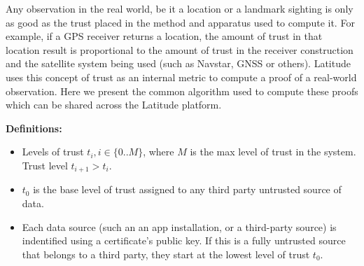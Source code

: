 Any observation in the real world, be it a location or a landmark sighting is only as good as the trust placed in the
method and apparatus used to compute it. For example, if a GPS receiver returns a location, the amount of trust in that
location result is proportional to the amount of trust in the receiver construction and the satellite system being used
(such as Navstar, GNSS or others). Latitude uses this concept of trust as an internal metric to compute a proof of a
real-world observation.  Here we present the common algorithm used to compute these proofs which can be shared across
the Latitude platform.

\newcommand\NF{\mathit{Nf}}
\newcommand\TM{\mathit{Tm}}
\noindent
{\bf Definitions:}
\begin{itemize}
    \item Levels of trust $t_i, i \in \{0..M\}$, where $M$ is the max level of trust in the system. Trust level $t_{i+1} >
        t_i$.
    \item $t_0$ is the base level of trust assigned to any third party untrusted source of data.

    \item Each data source (such an an app installation, or a third-party source) is indentified using a certificate's
        public key. If this is a fully untrusted source that belongs to a third party, they start at the lowest level of
        trust $t_0$.


\end{itemize}
